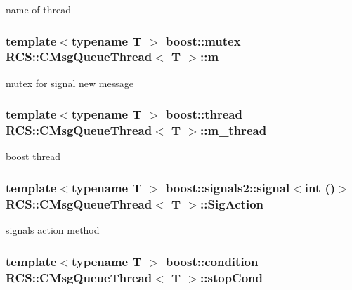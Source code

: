name of thread \hypertarget{classRCS_1_1CMsgQueueThread_a238d69660145a0aaaf44822073c353bf}{
\subsubsection[{m}]{\setlength{\rightskip}{0pt plus 5cm}template$<$typename T $>$ boost\-::mutex {\bf R\-C\-S\-::\-C\-Msg\-Queue\-Thread}$<$ T $>$\-::m\hspace{0.3cm}{\ttfamily [protected]}}}\label{classRCS_1_1CMsgQueueThread_a238d69660145a0aaaf44822073c353bf}
mutex for signal new message \hypertarget{classRCS_1_1CMsgQueueThread_afe3a75cabe791747c8d1464014e1f798}{
\subsubsection[{m\-\_\-thread}]{\setlength{\rightskip}{0pt plus 5cm}template$<$typename T $>$ boost\-::thread {\bf R\-C\-S\-::\-C\-Msg\-Queue\-Thread}$<$ T $>$\-::m\-\_\-thread\hspace{0.3cm}{\ttfamily [protected]}}}\label{classRCS_1_1CMsgQueueThread_afe3a75cabe791747c8d1464014e1f798}
boost thread \hypertarget{classRCS_1_1CMsgQueueThread_ad4d34f744d23222ec66655fbcb6a2580}{
\subsubsection[{Sig\-Action}]{\setlength{\rightskip}{0pt plus 5cm}template$<$typename T $>$ boost\-::signals2\-::signal$<$int ()$>$ {\bf R\-C\-S\-::\-C\-Msg\-Queue\-Thread}$<$ T $>$\-::Sig\-Action\hspace{0.3cm}{\ttfamily [protected]}}}\label{classRCS_1_1CMsgQueueThread_ad4d34f744d23222ec66655fbcb6a2580}
signals action method \hypertarget{classRCS_1_1CMsgQueueThread_a2d89255c589626cc327ea0f87e2d03f8}{
\subsubsection[{stop\-Cond}]{\setlength{\rightskip}{0pt plus 5cm}template$<$typename T $>$ boost\-::condition {\bf R\-C\-S\-::\-C\-Msg\-Queue\-Thread}$<$ T $>$\-::stop\-Cond\hspace{0.3cm}{\ttfamily [protected]}}}\label{classRCS_1_1CMsgQueueThread_a2d89255c589626cc327ea0f87e2d03f8}
